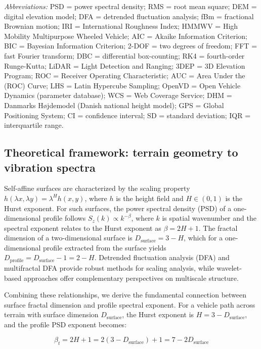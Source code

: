 \documentclass[11pt]{article}
\begin{document}
\textit{Abbreviations:} PSD = power spectral density; RMS = root mean square; DEM = digital elevation model; DFA = detrended fluctuation analysis; fBm = fractional Brownian motion; IRI = International Roughness Index; HMMWV = High Mobility Multipurpose Wheeled Vehicle; AIC = Akaike Information Criterion; BIC = Bayesian Information Criterion; 2-DOF = two degrees of freedom; FFT = fast Fourier transform; DBC = differential box-counting; RK4 = fourth-order Runge-Kutta; LiDAR = Light Detection and Ranging; 3DEP = 3D Elevation Program; ROC = Receiver Operating Characteristic; AUC = Area Under the (ROC) Curve; LHS = Latin Hypercube Sampling; OpenVD = Open Vehicle Dynamics (parameter database); WCS = Web Coverage Service; DHM = Danmarks H\o jdemodel (Danish national height model); GPS = Global Positioning System; CI = confidence interval; SD = standard deviation; IQR = interquartile range.

\subsection*{Theoretical framework: terrain geometry to vibration spectra}

Self-affine surfaces are characterized by the scaling property $h(\lambda x, \lambda y) = \lambda^H h(x,y)$, where $h$ is the height field and $H \in (0,1)$ is the Hurst exponent\cite{MandelbrotVanNess1968}. For such surfaces, the power spectral density (PSD) of a one-dimensional profile follows $S_z(k) \propto k^{-\beta}$, where $k$ is spatial wavenumber and the spectral exponent relates to the Hurst exponent as $\beta = 2H + 1$\cite{MandelbrotVanNess1968}. The fractal dimension of a two-dimensional surface is $D_{\text{surface}} = 3 - H$\cite{Mandelbrot1982,Turcotte1997}, which for a one-dimensional profile extracted from the surface yields $D_{\text{profile}} = D_{\text{surface}} - 1 = 2 - H$. Detrended fluctuation analysis (DFA)\cite{Peng1994} and multifractal DFA\cite{Kantelhardt2002} provide robust methods for scaling analysis, while wavelet-based approaches\cite{Muzy1993,Mallat2009} offer complementary perspectives on multiscale structure.

Combining these relationships, we derive the fundamental connection between surface fractal dimension and profile spectral exponent. For a vehicle path across terrain with surface dimension $D_{\text{surface}}$, the Hurst exponent is $H = 3 - D_{\text{surface}}$, and the profile PSD exponent becomes:

\begin{equation}
\beta_t = 2H + 1 = 2(3 - D_{\text{surface}}) + 1 = 7 - 2D_{\text{surface}}
\end{equation}
\end{document}
